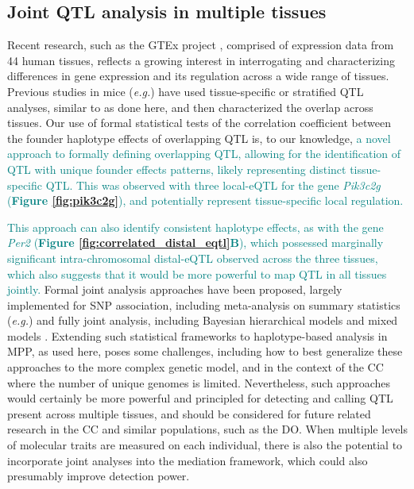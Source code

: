 \documentclass[9pt,twocolumn,twoside]{gsajnl}
\newcommand{\eg}{\emph{e.g.}\xspace}
\newcommand{\GKinline}[1]{\textcolor{teal}{#1}}
\begin{document}
\subsection{Joint QTL analysis in multiple tissues}

Recent research, such as the GTEx project \citep{GTEX2017}, comprised of expression data from 44 human tissues, reflects a growing interest in interrogating and characterizing differences in gene expression and its regulation across a wide range of tissues. Previous studies in mice (\eg \citealt{Huang2009}) have used tissue-specific or stratified QTL analyses, similar to as done here, and then characterized the overlap across tissues. Our use of formal statistical tests of the correlation coefficient between the founder haplotype effects of overlapping QTL is, to our knowledge, \GKinline{a novel approach to formally defining overlapping QTL, allowing for the identification of QTL with unique founder effects patterns, likely representing distinct tissue-specific QTL. This was observed with three local-eQTL for the gene \textit{Pik3c2g} (\textbf{Figure \ref{fig:pik3c2g}}), and potentially represent tissue-specific local regulation.}

\GKinline{This approach can also identify consistent haplotype effects, as with the gene \textit{Per2} (\textbf{Figure \ref{fig:correlated_distal_eqtl}B}), which possessed marginally significant intra-chromosomal distal-eQTL observed across the three tissues, which also suggests that it would be more powerful to map QTL in all tissues jointly.} Formal joint analysis approaches have been proposed, largely implemented for SNP association, including meta-analysis on summary statistics (\eg \citealt{Fu2012a, Sul2013}) and fully joint analysis, including Bayesian hierarchical models \citep{Flutre2013} and mixed models \citep{Acharya2016}. Extending such statistical frameworks to haplotype-based analysis in MPP, as used here, poses some challenges, including how to best generalize these approaches to the more complex genetic model, and in the context of the CC where the number of unique genomes is limited. Nevertheless, such approaches would certainly be more powerful and principled for detecting and calling QTL present across multiple tissues, and should be considered for future related research in the CC and similar populations, such as the DO. When multiple levels of molecular traits are measured on each individual, there is also the potential to incorporate joint analyses into the mediation framework, which could also presumably improve detection power.
\end{document}
